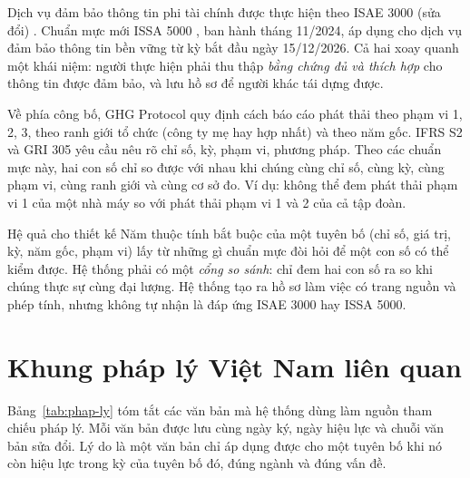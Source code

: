 Dịch vụ đảm bảo thông tin phi tài chính được thực hiện theo ISAE 3000 (sửa đổi) \cite{isae3000}. Chuẩn mực mới ISSA 5000 \cite{issa5000}, ban hành tháng 11/2024, áp dụng cho dịch vụ đảm bảo thông tin bền vững từ kỳ bắt đầu ngày 15/12/2026. Cả hai xoay quanh một khái niệm: người thực hiện phải thu thập \emph{bằng chứng đủ và thích hợp} cho thông tin được đảm bảo, và lưu hồ sơ để người khác tái dựng được.

Về phía công bố, GHG Protocol \cite{ghgprotocol} quy định cách báo cáo phát thải theo phạm vi 1, 2, 3, theo ranh giới tổ chức (công ty mẹ hay hợp nhất) và theo năm gốc. IFRS S2 \cite{ifrss2} và GRI 305 yêu cầu nêu rõ chỉ số, kỳ, phạm vi, phương pháp. Theo các chuẩn mực này, hai con số chỉ so được với nhau khi chúng cùng chỉ số, cùng kỳ, cùng phạm vi, cùng ranh giới và cùng cơ sở đo. Ví dụ: không thể đem phát thải phạm vi 1 của một nhà máy so với phát thải phạm vi 1 và 2 của cả tập đoàn.

\begin{hopy}{Hệ quả cho thiết kế}
Năm thuộc tính bắt buộc của một tuyên bố (chỉ số, giá trị, kỳ, năm gốc, phạm vi) lấy từ những gì chuẩn mực đòi hỏi để một con số có thể kiểm được. Hệ thống phải có một \emph{cổng so sánh}: chỉ đem hai con số ra so khi chúng thực sự cùng đại lượng. Hệ thống tạo ra hồ sơ làm việc có trang nguồn và phép tính, nhưng không tự nhận là đáp ứng ISAE 3000 hay ISSA 5000.
\end{hopy}

\section{Khung pháp lý Việt Nam liên quan}

Bảng~\ref{tab:phap-ly} tóm tắt các văn bản mà hệ thống dùng làm nguồn tham chiếu pháp lý. Mỗi văn bản được lưu cùng ngày ký, ngày hiệu lực và chuỗi văn bản sửa đổi. Lý do là một văn bản chỉ áp dụng được cho một tuyên bố khi nó còn hiệu lực trong kỳ của tuyên bố đó, đúng ngành và đúng vấn đề.

